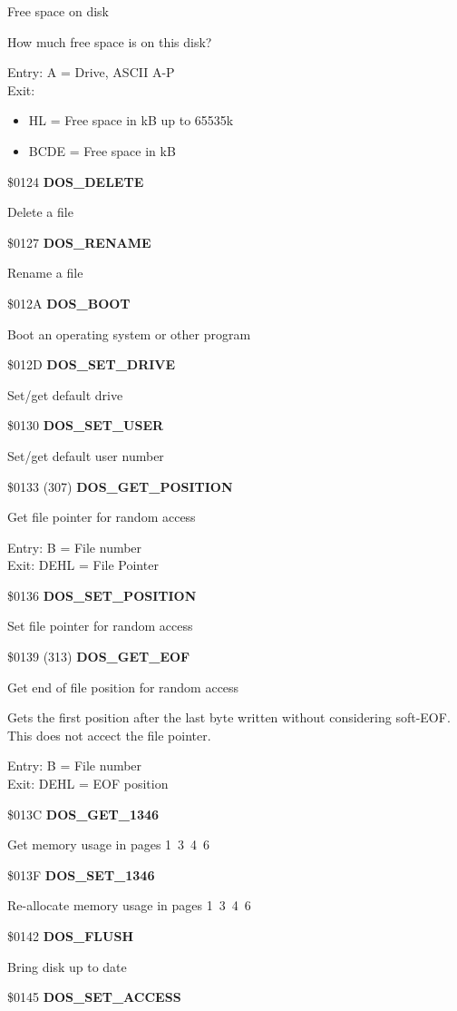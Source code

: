 Free space on disk

How much free space is on this disk?

Entry: A = Drive, ASCII A-P\\
Exit:
\begin{itemize}
\item[] HL = Free space in kB up to 65535k
\item[] BCDE = Free space in kB
\end{itemize}

\$0124 \textbf{DOS\_DELETE}

Delete a file

\$0127 \textbf{DOS\_RENAME}

Rename a file

\$012A \textbf{DOS\_BOOT}

Boot an operating system or other program

\$012D \textbf{DOS\_SET\_DRIVE}

Set/get default drive

\$0130 \textbf{DOS\_SET\_USER}

Set/get default user number

\$0133 (307) \textbf{DOS\_GET\_POSITION}

Get file pointer for random access

Entry: B = File number\\
Exit: DEHL = File Pointer

\$0136 \textbf{DOS\_SET\_POSITION}

Set file pointer for random access

\$0139 (313) \textbf{DOS\_GET\_EOF}

Get end of file position for random access

Gets the first position after the last byte written without
considering soft-EOF. This does not accect the file pointer.

Entry: B = File number\\
Exit: DEHL = EOF position

\$013C \textbf{DOS\_GET\_1346}

Get memory usage in pages 1\, 3\, 4\, 6

\$013F \textbf{DOS\_SET\_1346}

Re-allocate memory usage in pages 1\, 3\, 4\, 6

\$0142 \textbf{DOS\_FLUSH}

Bring disk up to date

\$0145 \textbf{DOS\_SET\_ACCESS}

